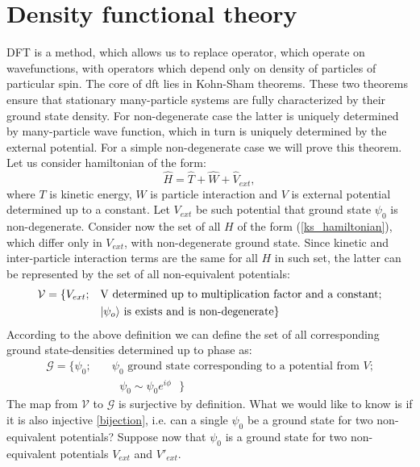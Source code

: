 \documentclass[openany, longbibliography,slovene,a4paper,12pt]{article}
\begin{document}
\section{Density functional theory}
DFT is a method, which allows us to replace operator, which operate on
wavefunctions, with operators which depend only on density of particles of
particular spin. The core of dft lies in Kohn-Sham theorems. These two theorems
ensure that stationary many-particle systems are fully characterized by their
ground state density. For non-degenerate case the latter is uniquely determined
by many-particle wave function, which in turn is uniquely determined by the
external potential. For a simple non-degenerate case we will prove this theorem. Let us consider hamiltonian of the form:
\begin{equation} \label{ks_hamiltonian}
\hat H = \hat T + \hat W + \hat V_{ext},
\end{equation}
where $T$ is kinetic energy, $W$ is particle interaction and $V$ is external
potential determined up to a constant. Let $V_{ext}$ be such potential that
ground state $\psi_0$ is non-degenerate. Consider now the set of all $H$ of the
form (\ref{ks_hamiltonian}), which
differ only in $V_{ext}$, with non-degenerate ground state. Since kinetic and
inter-particle interaction terms are the same for all $H$ in such set, the latter
can be represented by the set of all non-equivalent potentials:
\begin{equation}
  \begin{split}
    \mathcal{V} = \{V_{ext};\quad &\textrm{V determined up to multiplication factor and a constant;}\\
    & \textrm{$\ket{\psi_o}$ is exists and is non-degenerate}\}
    \end{split}
 \end{equation}
According to the above definition we can define the set of all corresponding
ground state-densities determined up to phase as:
\begin{equation}
  \begin{split}
    \mathcal{G} = \{\psi_0; \quad &\textrm{$\psi_0$ ground state corresponding to a potential from $V$;}\\
&\textrm{ $\psi_0\sim\psi_0e^{i\phi}$   }
    \}
    \end{split}
  \end{equation}
The map from $\mathcal{V}$ to $\mathcal{G}$ is surjective by definition. What we
would like to know is if it is also injective  \ref{bijection}, i.e. can a single $\psi_0$ be a
ground state for two non-equivalent potentials? Suppose now that $\psi_0$ is a
ground state for two non-equivalent potentials $V_{ext}$ and $V'_{ext}$.
\end{document}
